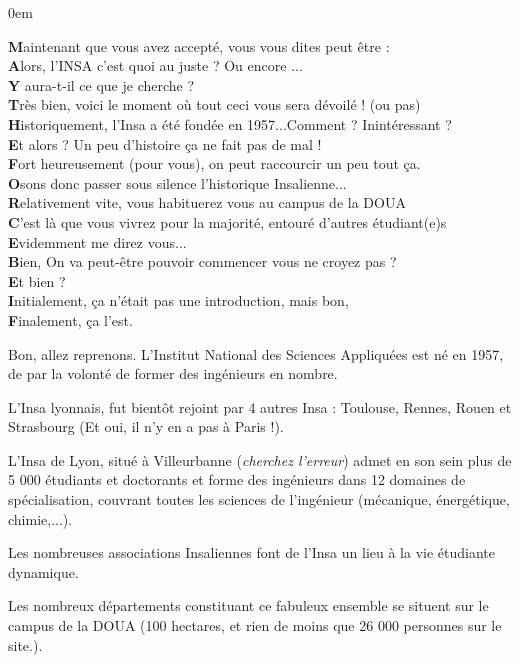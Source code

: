 {
    \footnotesize
    \parindent 0em
    \begin{changemargin}{-1cm}{0cm}
\textbf{M}aintenant que vous avez accepté, vous vous dites peut être :\\
\textbf{A}lors, l'INSA c'est quoi au juste ? Ou encore ...\\
\textbf{Y} aura-t-il ce que je cherche ?\\

\textbf{T}rès bien, voici le moment où tout ceci vous sera dévoilé ! (ou pas)\\
\textbf{H}istoriquement, l'Insa a été fondée en 1957...Comment ? Inintéressant
?\\
\textbf{E}t alors ? Un peu d'histoire ça ne fait pas de mal !\\

\textbf{F}ort heureusement (pour vous), on peut raccourcir un peu tout ça.\\
\textbf{O}sons donc passer sous silence l'historique Insalienne...\\
\textbf{R}elativement vite, vous habituerez vous au campus de la DOUA\\
\textbf{C}'est là que vous vivrez pour la majorité, entouré d'autres
étudiant(e)s\\
\textbf{E}videmment me direz vous...\\

\textbf{B}ien, On va peut-être pouvoir commencer vous ne croyez pas ?\\
\textbf{E}t bien ?\\

\textbf{I}nitialement, ça n'était pas une introduction, mais bon,\\
\textbf{F}inalement, ça l'est.\\
\end{changemargin}
} %

Bon, allez reprenons.
L'Institut National des Sciences Appliquées est né en 1957, de par la volonté de
former des ingénieurs en nombre.

L'Insa lyonnais, fut bientôt rejoint par 4 autres Insa : Toulouse, Rennes, Rouen
et Strasbourg (Et oui, il n'y en a pas à Paris !).

L'Insa de Lyon, situé à Villeurbanne (\emph{cherchez l'erreur}) admet en son sein plus
de 5 000 étudiants et doctorants et forme des ingénieurs dans 12 domaines de
spécialisation, couvrant toutes les sciences de l'ingénieur (mécanique,
énergétique, chimie,...).

Les nombreuses associations Insaliennes font de l'Insa un lieu à la vie
étudiante dynamique.

Les nombreux départements constituant ce fabuleux ensemble se situent sur le
campus de la DOUA (100 hectares, et rien de moins que 26 000 personnes sur le
site.).
